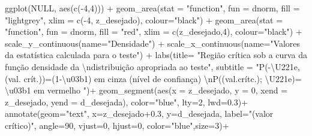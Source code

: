 \documentclass[
]{book}
\newenvironment{Shaded}{\begin{snugshade}}{\end{snugshade}}
\newcommand{\AttributeTok}[1]{\textcolor[rgb]{0.77,0.63,0.00}{#1}}
\newcommand{\ConstantTok}[1]{\textcolor[rgb]{0.00,0.00,0.00}{#1}}
\newcommand{\DecValTok}[1]{\textcolor[rgb]{0.00,0.00,0.81}{#1}}
\newcommand{\FloatTok}[1]{\textcolor[rgb]{0.00,0.00,0.81}{#1}}
\newcommand{\FunctionTok}[1]{\textcolor[rgb]{0.00,0.00,0.00}{#1}}
\newcommand{\NormalTok}[1]{#1}
\newcommand{\SpecialCharTok}[1]{\textcolor[rgb]{0.00,0.00,0.00}{#1}}
\newcommand{\StringTok}[1]{\textcolor[rgb]{0.31,0.60,0.02}{#1}}
\begin{document}
\begin{Shaded}
\begin{Highlighting}[]
\FunctionTok{ggplot}\NormalTok{(}\ConstantTok{NULL}\NormalTok{, }\FunctionTok{aes}\NormalTok{(}\FunctionTok{c}\NormalTok{(}\SpecialCharTok{{-}}\DecValTok{4}\NormalTok{,}\DecValTok{4}\NormalTok{))) }\SpecialCharTok{+}
  \FunctionTok{geom\_area}\NormalTok{(}\AttributeTok{stat =} \StringTok{"function"}\NormalTok{, }
            \AttributeTok{fun =}\NormalTok{ dnorm, }
            \AttributeTok{fill =} \StringTok{"lightgrey"}\NormalTok{, }
            \AttributeTok{xlim =} \FunctionTok{c}\NormalTok{(}\SpecialCharTok{{-}}\DecValTok{4}\NormalTok{, z\_desejado),}
            \AttributeTok{colour=}\StringTok{"black"}\NormalTok{) }\SpecialCharTok{+}
  \FunctionTok{geom\_area}\NormalTok{(}\AttributeTok{stat =} \StringTok{"function"}\NormalTok{, }
            \AttributeTok{fun =}\NormalTok{ dnorm, }
            \AttributeTok{fill =} \StringTok{"red"}\NormalTok{, }
            \AttributeTok{xlim =} \FunctionTok{c}\NormalTok{(z\_desejado,}\DecValTok{4}\NormalTok{),}
            \AttributeTok{colour=}\StringTok{"black"}\NormalTok{) }\SpecialCharTok{+}
  \FunctionTok{scale\_y\_continuous}\NormalTok{(}\AttributeTok{name=}\StringTok{"Densidade"}\NormalTok{) }\SpecialCharTok{+}
  \FunctionTok{scale\_x\_continuous}\NormalTok{(}\AttributeTok{name=}\StringTok{"Valores da estatística calculada para o teste"}\NormalTok{)  }\SpecialCharTok{+}
  \FunctionTok{labs}\NormalTok{(}\AttributeTok{title=} 
         \StringTok{"Região crítica sob a curva da função densidade da }\SpecialCharTok{\textbackslash{}n}\StringTok{distribuição apropriada ao teste"}\NormalTok{, }
       \AttributeTok{subtitle =} \StringTok{"P({-}\textbackslash{}U221e, (val. crít.))=(1{-}\textbackslash{}u03b1) em cinza (nível de confiança) }\SpecialCharTok{\textbackslash{}n}\StringTok{P((val.crítc.); \textbackslash{}U221e)= \textbackslash{}u03b1 em vermelho "}\NormalTok{)}\SpecialCharTok{+}
\FunctionTok{geom\_segment}\NormalTok{(}\FunctionTok{aes}\NormalTok{(}\AttributeTok{x =}\NormalTok{ z\_desejado, }\AttributeTok{y =} \DecValTok{0}\NormalTok{, }\AttributeTok{xend =}\NormalTok{ z\_desejado, }\AttributeTok{yend =}\NormalTok{ d\_desejada), }\AttributeTok{color=}\StringTok{"blue"}\NormalTok{, }\AttributeTok{lty=}\DecValTok{2}\NormalTok{, }\AttributeTok{lwd=}\FloatTok{0.3}\NormalTok{)}\SpecialCharTok{+}
\FunctionTok{annotate}\NormalTok{(}\AttributeTok{geom=}\StringTok{"text"}\NormalTok{, }\AttributeTok{x=}\NormalTok{z\_desejado}\FloatTok{+0.3}\NormalTok{, }\AttributeTok{y=}\NormalTok{d\_desejada, }\AttributeTok{label=}\StringTok{"(valor crítico)"}\NormalTok{, }\AttributeTok{angle=}\DecValTok{90}\NormalTok{, }\AttributeTok{vjust=}\DecValTok{0}\NormalTok{, }\AttributeTok{hjust=}\DecValTok{0}\NormalTok{, }\AttributeTok{color=}\StringTok{"blue"}\NormalTok{,}\AttributeTok{size=}\DecValTok{3}\NormalTok{)}\SpecialCharTok{+}

\end{Highlighting}
\end{Shaded}
\end{document}

